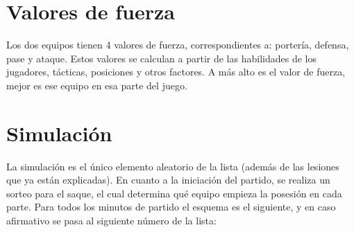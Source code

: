 \documentclass[a4paper,9pt]{article}
\begin{document}
\section{Valores de fuerza}
Los dos equipos tienen 4 valores de fuerza, correspondientes a: porter\'ia, defensa, pase y ataque. Estos valores se calculan a partir de las habilidades de los jugadores, t\'acticas, posiciones y otros factores. A m\'as alto es el valor de fuerza, mejor es ese equipo en esa parte del juego.
\section{Simulaci\'on}
La simulaci\'on es el \'unico elemento aleatorio de la lista (adem\'as de las lesiones que ya est\'an explicadas). En cuanto a la iniciaci\'on del partido, se realiza un sorteo para el saque, el cual determina qu\'e equipo empieza la posesi\'on en cada parte. Para todos los minutos de partido el esquema es el siguiente, y en caso afirmativo se pasa al siguiente n\'umero de la lista:
\end{document}

